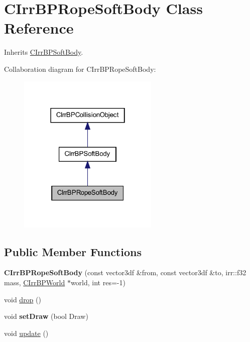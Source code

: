 \hypertarget{class_c_irr_b_p_rope_soft_body}{
\section{CIrrBPRopeSoftBody Class Reference}
\label{class_c_irr_b_p_rope_soft_body}
}


Inherits \hyperlink{class_c_irr_b_p_soft_body}{CIrrBPSoftBody}.



Collaboration diagram for CIrrBPRopeSoftBody:\nopagebreak
\begin{figure}[H]
\begin{center}
\leavevmode
\includegraphics[width=190pt]{class_c_irr_b_p_rope_soft_body__coll__graph}
\end{center}
\end{figure}
\subsection*{Public Member Functions}
\begin{DoxyCompactItemize}
\item 
\hypertarget{class_c_irr_b_p_rope_soft_body_a118d2f2b2c62e362b28fb1a31c16c487}{
{\bfseries CIrrBPRopeSoftBody} (const vector3df \&from, const vector3df \&to, irr::f32 mass, \hyperlink{class_c_irr_b_p_world}{CIrrBPWorld} $\ast$world, int res=-\/1)}
\label{class_c_irr_b_p_rope_soft_body_a118d2f2b2c62e362b28fb1a31c16c487}

\item 
void \hyperlink{class_c_irr_b_p_rope_soft_body_a5db23f15158062419311562d42aa22c9}{drop} ()
\item 
\hypertarget{class_c_irr_b_p_rope_soft_body_ab8be3d53c282d3ccb18ab1d6266147cf}{
void {\bfseries setDraw} (bool Draw)}
\label{class_c_irr_b_p_rope_soft_body_ab8be3d53c282d3ccb18ab1d6266147cf}

\item 
void \hyperlink{class_c_irr_b_p_rope_soft_body_ab6ae47a99c795fd10737fda7a350fc85}{update} ()
\end{DoxyCompactItemize}
